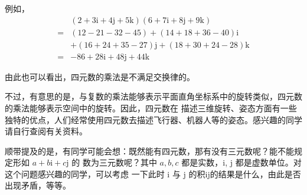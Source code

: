 \documentclass[a4paper,openany]{ctexbook}
\begin{document}
例如，
\begin{align*}
      & (2 + 3\mathrm{i} + 4\mathrm{j} + 5\mathrm{k})(6 + 7\mathrm{i} + 8\mathrm{j} + 9\mathrm{k}) \\
    = & (12 - 21 - 32 - 45) +(14 + 18 + 36 - 40)\mathrm{i}                                         \\
      & +(16 + 24 + 35 - 27)\mathrm{j} +(18 + 30 + 24 - 28)\mathrm{k}                              \\
    = & -86 + 28\mathrm{i} + 48\mathrm{j} + 44\mathrm{k}
\end{align*}

由此也可以看出，四元数的乘法是不满足交换律的。

不过，有意思的是，与复数的乘法能够表示平面直角坐标系中的旋转类似，四元数的乘法能够表示空间中的旋转。因此，四元数在
描述三维旋转、姿态方面有一些独特的优点，人们经常使用四元数去描述飞行器、机器人等的姿态。感兴趣的同学请自行查阅有关资料。

顺带提及的是，有同学可能会想：既然能有四元数，那有没有三元数呢？能不能规定形如 \(a + b\mathrm{i} + c\mathrm{j}\) 的
数为三元数呢？其中 \(a, b, c\) 都是实数，$\mathrm{i}$, $\mathrm{j}$ 都是虚数单位。对这个问题感兴趣的同学，可以考虑
一下此时 $\mathrm{i}$ 与 $\mathrm{j}$ 的积$\mathrm{i}\mathrm{j}$的结果是什么，由此是否出现矛盾，等等。

\listoftheorems[ignoreall,show={thmlevel1},title=定理索引]

\printindex
\end{document}
